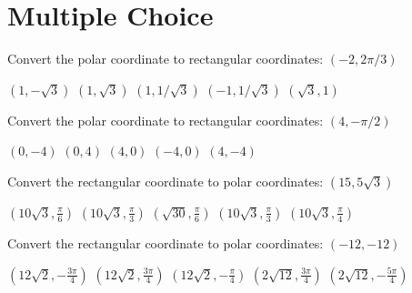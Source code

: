 \documentclass[11pt]{exam}
\begin{document}
\section{Multiple Choice}
\begin{questions}
	\begin{minipage}{\linewidth}
		\question Convert the polar coordinate to rectangular coordinates: $(-2, 2\pi/3)$

\begin{choices}
	\CorrectChoice $\left(1,-\sqrt{3}\right)$
	\choice $\left(1,\sqrt{3}\right)$
	\choice $\left(1,1/\sqrt{3}\right)$
	\choice $\left(-1,1/\sqrt{3}\right)$
	\choice $\left(\sqrt{3},1\right)$

\end{choices} \answerline
\end{minipage}

\begin{minipage}{\linewidth}
\question Convert the polar coordinate to rectangular coordinates: $(4,-\pi/2)$

\begin{choices}
	\CorrectChoice $\left(0,-4\right)$
	\choice $\left(0,4\right)$
	\choice $\left(4,0\right)$
	\choice $\left(-4,0\right)$
	\choice $\left(4,-4\right)$
\end{choices} \answerline
\end{minipage}

\begin{minipage}{\linewidth}



\question Convert the rectangular coordinate to polar coordinates: $(15, 5\sqrt{3})$

\begin{choices}
	\CorrectChoice $\left(10 \sqrt{3},\frac{\pi }{6}\right)$
	\choice $\left(10 \sqrt{3},\frac{\pi }{3}\right)$
	\choice $\left(\sqrt{30},\frac{\pi }{6}\right)$
	\choice $\left(10 \sqrt{3},\frac{\pi }{3}\right)$
	\choice $\left(10 \sqrt{3},\frac{\pi }{4}\right)$

\end{choices} \answerline
\end{minipage}

\begin{minipage}{\linewidth}



\question Convert the rectangular coordinate to polar coordinates: $(-12, -12)$

\begin{choices}
	\CorrectChoice $\left(12 \sqrt{2},-\frac{3 \pi }{4}\right)$
	\choice $\left(12 \sqrt{2},\frac{3 \pi }{4}\right)$
	\choice $\left(12 \sqrt{2},-\frac{\pi }{4}\right)$
	\choice $\left(2 \sqrt{12},\frac{3 \pi }{4}\right)$
	\choice $\left(2 \sqrt{12},-\frac{5 \pi }{4}\right)$
\end{choices} \answerline


\end{minipage}
\end{questions}
\end{document}
